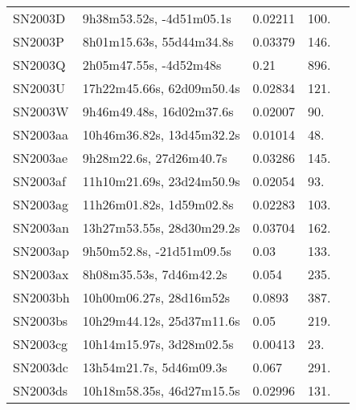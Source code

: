 \begin{longtable}{lllll}
          SN2003D &       9h38m53.52s, -4d51m05.1s &  0.02211 &           100. &    \citet{1992ApJ...399..353H} \\
          SN2003P &       8h01m15.63s, 55d44m34.8s &  0.03379 &           146. &    \citet{2000UZC...C......0F} \\
          SN2003Q &         2h05m47.55s, -4d52m48s &     0.21 &           896. &    \citet{2003IAUC.8058A...1G} \\
          SN2003U &      17h22m45.66s, 62d09m50.4s &  0.02834 &           121. &    \citet{2001SDSSe.1...0000:} \\
          SN2003W &       9h46m49.48s, 16d02m37.6s &  0.02007 &            90. &    \citet{1991RC3.9.C...0000d} \\
         SN2003aa &      10h46m36.82s, 13d45m32.2s &  0.01014 &            48. &    \citet{2006HIPAS.C...0000:} \\
         SN2003ae &        9h28m22.6s, 27d26m40.7s &  0.03286 &           145. &    \citet{2006SDSS5.C...0000:} \\
         SN2003af &      11h10m21.69s, 23d24m50.9s &  0.02054 &            93. &    \citet{2007SDSS6.C...0000:} \\
         SN2003ag &       11h26m01.82s, 1d59m02.8s &  0.02283 &           103. &    \citet{2003SDSS1.C...0000:} \\
         SN2003an &      13h27m53.55s, 28d30m29.2s &  0.03704 &           162. &    \citet{2003AJ....126.2152R} \\
         SN2003ap &       9h50m52.8s, -21d51m09.5s &     0.03 &           133. &    \citet{2003IAUC.8071A...1W} \\
         SN2003ax &        8h08m35.53s, 7d46m42.2s &    0.054 &           235. &    \citet{2003IAUC.8085B...1F} \\
         SN2003bh &        10h00m06.27s, 28d16m52s &   0.0893 &           387. &    \citet{2007SDSS6.C...0000:} \\
         SN2003bs &      10h29m44.12s, 25d37m11.6s &     0.05 &           219. &    \citet{2003IAUC.8090B...1W} \\
         SN2003cg &       10h14m15.97s, 3d28m02.5s &  0.00413 &            23. &  \citet{2001AandA...378..370V} \\
         SN2003dc &        13h54m21.7s, 5d46m09.3s &    0.067 &           291. &    \citet{2003IAUC.8105A...1W} \\
         SN2003ds &      10h18m58.35s, 46d27m15.5s &  0.02996 &           131. &    \citet{2004SDSS3.C...0000:} \\

\end{longtable}
